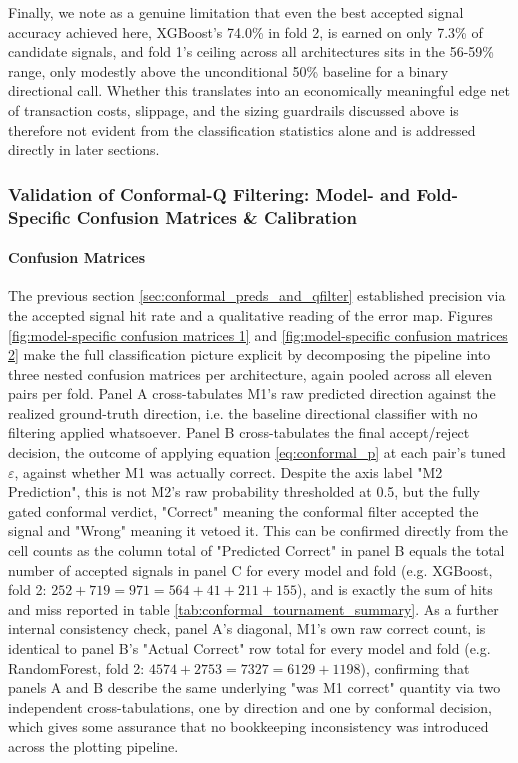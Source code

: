 \documentclass[12pt, a4paper]{article}
\begin{document}
\medskip

Finally, we note as a genuine limitation that even the best accepted signal accuracy achieved here, XGBoost's 74.0\% in fold 2, is earned on only 7.3\% of candidate signals, 
and fold 1's ceiling across all architectures sits in the 56-59\% range, only modestly above the unconditional 50\% baseline for a binary directional call. Whether this 
translates into an economically meaningful edge net of transaction costs, slippage, and the sizing guardrails discussed above is therefore not evident from the classification 
statistics alone and is addressed directly in later sections.


\subsubsection{Validation of Conformal-Q Filtering: Model- and Fold-Specific Confusion Matrices \& Calibration}

\paragraph{Confusion Matrices}\label{sec:confusion_matrices_tournament}\hspace{0pt}

The previous section \ref{sec:conformal_preds_and_qfilter} established precision via the accepted signal hit rate and a qualitative reading of the error map. Figures 
\ref{fig:model-specific confusion matrices 1} and \ref{fig:model-specific confusion matrices 2} make the full classification picture explicit by decomposing the pipeline into three nested 
confusion matrices per architecture, again pooled across all eleven pairs per fold. Panel A cross-tabulates M1's raw predicted direction against the realized ground-truth 
direction, i.e. the baseline directional classifier with no filtering applied whatsoever. Panel B cross-tabulates the final accept/reject decision, the outcome of 
applying equation \ref{eq:conformal_p} at each pair's tuned $\varepsilon$, against whether M1 was actually correct. Despite the axis label "M2 Prediction", this is not M2's raw 
probability thresholded at 0.5, but the fully gated conformal verdict, "Correct" meaning the conformal filter accepted the signal and "Wrong" meaning it vetoed it. This can be 
confirmed directly from the cell counts as the column total of "Predicted Correct" in panel B equals the total number of accepted signals in panel C for every model and fold 
(e.g. XGBoost, fold 2: $252+719=971=564+41+211+155$), and is exactly the sum of hits and miss reported in table \ref{tab:conformal_tournament_summary}. As a further internal 
consistency check, panel A's diagonal, M1's own raw correct count, is identical to panel B's "Actual Correct" row total for every model and fold (e.g. RandomForest, fold 2: 
$4574+2753=7327=6129+1198$), confirming that panels A and B describe the same underlying "was M1 correct" quantity via two independent cross-tabulations, one by direction 
and one by conformal decision, which gives some assurance that no bookkeeping inconsistency was introduced across the plotting pipeline.
\end{document}

